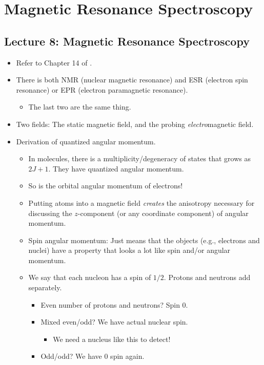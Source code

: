 \documentclass[../notes.tex]{subfiles}
\begin{document}
\chapter{Magnetic Resonance Spectroscopy}
\section{Lecture 8: Magnetic Resonance Spectroscopy}
\begin{itemize}
    \item {}Refer to Chapter 14 of \textcite{bib:McQuarrieSimon}.
    \item There is both NMR (nuclear magnetic resonance) and ESR (electron spin resonance) or EPR (electron paramagnetic resonance).
    \begin{itemize}
        \item The last two are the same thing.
    \end{itemize}
    \item Two fields: The static magnetic field, and the probing \emph{electro}magnetic field.
    \item Derivation of quantized angular momentum.
    \begin{itemize}
        \item In molecules, there is a multiplicity/degeneracy of states that grows as $2J+1$. They have quantized angular momentum.
        \item So is the orbital angular momentum of electrons!
        \item Putting atoms into a magnetic field \emph{creates} the anisotropy necessary for discussing the $z$-component (or any coordinate component) of angular momentum.
        \item Spin angular momentum: Just means that the objects (e.g., electrons and nuclei) have a property that looks a lot like spin and/or angular momentum.
        \item We say that each nucleon has a spin of $1/2$. Protons and neutrons add separately.
        \begin{itemize}
            \item Even number of protons and neutrons? Spin 0.
            \item Mixed even/odd? We have actual nuclear spin.
            \begin{itemize}
                \item We need a nucleus like this to detect!
            \end{itemize}
            \item Odd/odd? We have 0 spin again.

\end{itemize}
\end{itemize}
\end{itemize}
\end{document}
